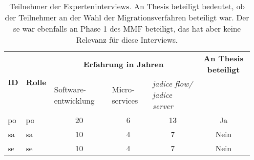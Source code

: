 \begin{table}[!ht]
  \centering
  \begin{tabular}{|l|l| p{1.8cm} p{1.5cm} p{2cm}|c|}
    \toprule
    \multirow{2}{*}[0cm]{\textbf{ID}} & \multirow{2}{*}[0cm]{\textbf{Rolle}} & \multicolumn{3}{c|}{\textbf{Erfahrung in Jahren}} & \textbf{An Thesis beteiligt} \\
     & & Software-entwicklung & Micro-services & \emph{jadice flow/ jadice server} & \\ \midrule
    \acrshort{po} & \acrlong{po} & \multicolumn{1}{c}{20} & \multicolumn{1}{c}{6} & \multicolumn{1}{c|}{13} & Ja \\
    \acrshort{sa} & \acrlong{sa}       & \multicolumn{1}{c}{10} & \multicolumn{1}{c}{4} & \multicolumn{1}{c|}{7} & Nein \\
   \acrshort{se} & \acrlong{se}     & \multicolumn{1}{c}{10} & \multicolumn{1}{c}{4} & \multicolumn{1}{c|}{7} & Nein \\
    \bottomrule
  \end{tabular}
  \caption[Teilnehmer der Experteninterviews]{
    Teilnehmer der Experteninterviews.
    An Thesis beteiligt bedeutet, ob der Teilnehmer an der Wahl der Migrationsverfahren beteiligt war.
    Der \acrshort{se} war ebenfalls an Phase 1 des MMF beteiligt, das hat aber keine Relevanz für diese Interviews.
  }
  \label{tab:expert-interviewees}
\end{table}
